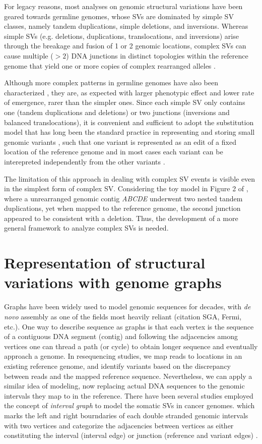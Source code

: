 \documentclass[phd,tocprelim]{cornell}
\begin{document}
For legacy reasons, most analyses on genomic structural variations have been geared towards germline genomes, whose SVs are dominated by simple SV classes, namely tandem duplications, simple deletions, and inversions. Whereas simple SVs (e.g. deletions, duplications, translocations, and inversions) arise through the breakage and fusion of 1 or 2 genomic locations, complex SVs can cause multiple ($>2$) DNA junctions in distinct topologies within the reference genome that yield one or more copies of complex rearranged alleles \cite{maciejowski2017}.

Although more complex patterns in germline genomes have also been characterized \cite{Carvalho2011-lb,Collins2020-iv}, they are, as expected with larger phenotypic effect and lower rate of emergence, rarer than the simpler ones. Since each simple SV only contains one (tandem duplications and deletions) or two junctions (inversions and balanced translocations), it is convenient and sufficient to adopt the substitution model that has long been the standard practice in representing and storing small genomic variants \cite{Li2008-su}, such that one variant is represented as an edit of a fixed location of the reference genome and in most cases each variant can be interepreted independently from the other variants \cite{Li2009-fv}.

The limitation of this approach in dealing with complex SV events is visible even in the simplest form of complex SV. Considering the toy model in Figure 2 of \cite{Maciejowski2016-nf}, where a unrearranged genomic contig \textit{ABCDE} underwent two nested tandem duplications, yet when mapped to the reference genome, the second junction appeared to be consistent with a deletion. Thus, the development of a more general framework to analyze complex SVs is needed.


\section{Representation of structural variations with genome graphs}
Graphs have been widely used to model genomic sequences for decades, with \textit{de novo} assembly as one of the fields most heavily reliant (citation SGA, Fermi, etc.). One way to describe sequence as graphs is that each vertex is the sequence of a contiguous DNA segment (contig) and following the adjacencies among vertices one can thread a path (or cycle) to obtain longer sequence and eventually approach a genome. In resequencing studies, we map reads to locations in an existing reference genome, and identify variants based on the discrepancy between reads and the mapped reference sequence. Nevertheless, we can apply a similar idea of modeling, now replacing actual DNA sequences to the genomic intervals they map to in the reference. There have been several studies employed the concept of \textit{interval graph} to model the somatic SVs in cancer genomes. which marks the left and right bourndaries of each double stranded genomic intervals with two vertices and categorize the adjacencies between vertices as either constituting the interval (interval edge) or junction (reference and variant edges) \cite{Oesper2012-vw}.
\end{document}

